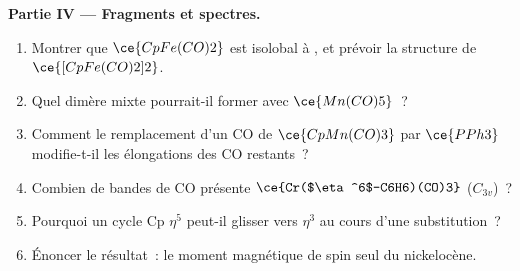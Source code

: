 \begin{problem}
\medskip\noindent\textbf{Partie IV --- Fragments et spectres.}
\begin{enumerate}[resume]
  \item Montrer que $\ce{CpFe(CO)2}$ est isolobal à , et prévoir la structure de
        $\ce{[CpFe(CO)2]2}$.
  \item Quel dimère mixte pourrait-il former avec $\ce{Mn(CO)5}$~?
  \item Comment le remplacement d'un CO de $\ce{CpMn(CO)3}$ par $\ce{PPh3}$ modifie-t-il les
        élongations des CO restants~?
  \item Combien de bandes de CO présente $\ce{Cr($\eta^6$-C6H6)(CO)3}$ ($C_{3v}$)~?
  \item Pourquoi un cycle Cp $\eta^5$ peut-il glisser vers $\eta^3$ au cours d'une substitution~?
  \item Énoncer le résultat~: le moment magnétique de spin seul du
        nickelocène.
\end{enumerate}
\end{problem}
